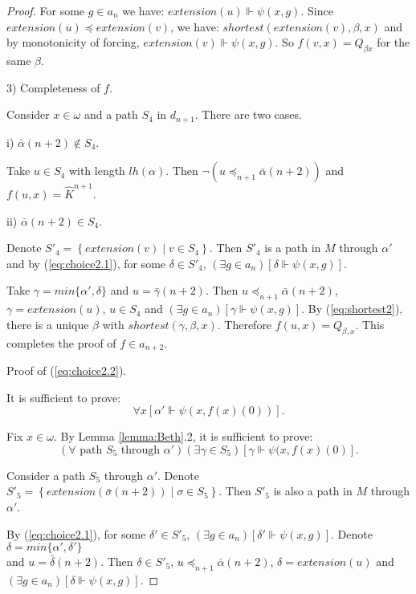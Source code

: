 \documentclass{asl}
\theoremstyle{definition}
\begin{document}
\begin{proof}
For some $g\in a_n$ we have:  $extension(u)\Vdash \psi(x,g)$. Since $extension(u)\preccurlyeq extension(v)$, we have: $shortest(extension(v),\beta,x)$ and by monotonicity of forcing, $extension(v)\Vdash \psi(x,g)$. So $f(v,x)=Q_{\beta x}$ for the same $\beta$.

3) Completeness of $f$.

Consider $x\in \omega$ and a path $S_4$ in $d_{n+1}$. There are two cases.

i) $\bar{\alpha}({n+2})\notin S_4$.

Take $u\in S_4$ with length $lh(\alpha)$. Then $\neg (u\preccurlyeq_{n+1}\bar{\alpha}({n+2}))$ and $f(u,x)=\widehat{K}^{n+1}$.

ii) $\bar{\alpha}({n+2})\in S_4$.

Denote $S'_4=\left\lbrace extension(v)\mid v\in S_4\right\rbrace $. Then $S'_4$ is a path in $M$ through $\alpha'$ and by (\ref{eq:choice2.1}), for some $\delta\in S'_4$, $(\exists g\in a_n)\left[\delta\Vdash \psi(x,g)\right] $. 
\smallskip

Take $\gamma=min\{\alpha',\delta\}$ and $u=\bar{\gamma}({n+2})$. Then $u\preccurlyeq_{n+1}\bar{\alpha}({n+2})$, $\gamma=extension(u)$, $u\in S_4$ and $(\exists g\in a_n)\left[\gamma\Vdash \psi(x,g)\right] $. By (\ref{eq:shortest2}), there is a unique $\beta$ with $shortest(\gamma,\beta,x)$. Therefore $f(u,x)=Q_{\beta, x}$. This completes the proof of $f\in a_{n+2}$.

\begin{center}
Proof of (\ref{eq:choice2.2}). 
\end{center}

It is sufficient to prove:
\[ \forall x\left[\alpha'\Vdash \psi(x,f(x)(0))\right].\]

Fix $x\in \omega$. By Lemma \ref{lemma:Beth}.2, it is sufficient to prove:
\[(\forall \text{ path }S_5\text{ through }\alpha')(\exists \gamma\in S_5)\left[\gamma\Vdash \psi(x,f(x)(0) \right] . \]

Consider a path $S_5$ through $\alpha'$. Denote $S'_5=\left\lbrace extension(\bar{\sigma}(n+2))\mid \sigma\in S_5\right\rbrace$. Then $S'_5$ is also a path in $M$ through $\alpha'$. 
\medskip

By (\ref{eq:choice2.1}), for some $\delta'\in S'_5$, $(\exists g\in a_n)\left[\delta' \Vdash \psi(x,g) \right] $. Denote $\delta=min\{\alpha', \delta'\}$ 
\smallskip
\\and $u=\bar{\delta}(n+2)$. 
Then $\delta\in S'_5$, $u\preccurlyeq_{n+1} \bar{\alpha}({n+2})$, $\delta=extension(u)$ and $(\exists g\in a_n)\left[\delta \Vdash \psi(x,g)\right]$. 
\medskip


\end{proof}
\end{document}
